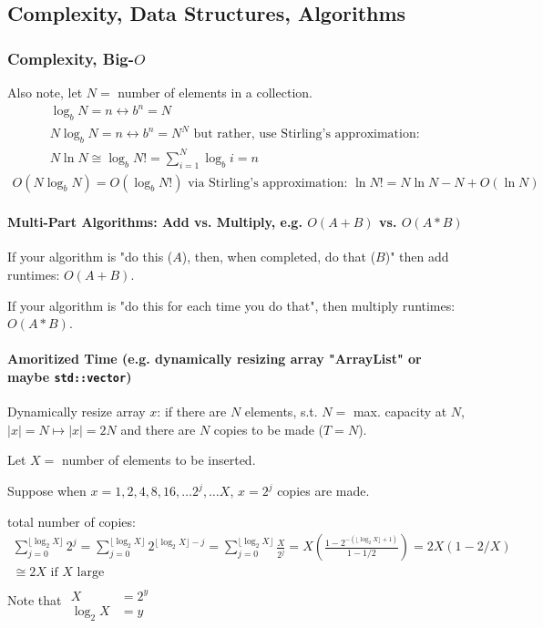 \documentclass[10pt]{amsart}
\begin{document}
\begin{multicols*}{2}
\part{Complexity, Data Structures, Algorithms}

\section{Complexity, Big-$O$}

Also note, let $N = $ number of elements in a collection.
\[
\begin{gathered}
	\log_b{N} = n \leftrightarrow b^n = N \\ 
 N \log_b{N} = n \leftrightarrow b^n = N^N \text{ but rather, use Stirling's approximation: } \\
 N \ln N \cong \log_b{N!} = \sum_{i=1}^N \log_b{i} = n  
\end{gathered}
\]
\[
\begin{gathered}
	O(N\log_b{N}) = O(\log_b{N!}) \text{ via Stirling's approximation: } \ln{N!} = N\ln{N} - N + O(\ln{N})
\end{gathered}
\]

\subsection{Multi-Part Algorithms: Add vs. Multiply, e.g. $O(A + B)$ vs. $O(A*B)$}

If your algorithm is "do this ($A$), then, when completed, do that ($B$)" then add runtimes: $O(A+B)$.

If your algorithm is "do this for each time you do that", then multiply runtimes: $O(A*B)$.

\subsection{Amoritized Time (e.g. dynamically resizing array "ArrayList" or maybe \texttt{std::vector})}

Dynamically resize array $x$: if there are $N$ elements, s.t. $N= $ max. capacity at $N$, $|x| = N \mapsto |x| = 2N$ and there are $N$ copies to be made ($T=N$). 

Let $X = $ number of elements to be inserted. 

Suppose when $x=1, 2, 4, 8, 16, \dots 2^j, \dots X$, $x= 2^j$ copies are made. 

total number of copies:
\[
\begin{gathered}
\sum_{j=0}^{ \lfloor \log_2{X} \rfloor } 2^j = \sum_{j=0}^{ \lfloor \log_2{X} \rfloor } 2^{ \lfloor \log_2{X} \rfloor - j} = \sum_{j=0}^{ \lfloor \log_2{X} \rfloor } \frac{X}{2^j} = X\left( \frac{ 1 - 2^{ - (\lfloor \log_2{X} \rfloor  + 1)} }{ 1 - 1/2} \right) = 2X \left( 1 - 2/X \right) \\
\cong 2X \text{ if $X$ large } 
\end{gathered}
\]
Note that $\begin{aligned} & \quad \\ 
 X & = 2^y \\ 
 \log_2{X} & = y \end{aligned}$ 
 

\end{multicols*}
\end{document}
